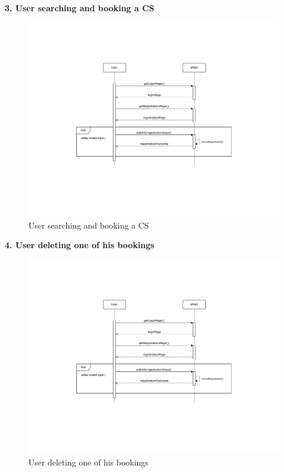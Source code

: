 \documentclass[11pt]{article}
\begin{document}
\begin{description}
    \item \textbf{3. User searching and booking a CS}
    \begin{figure}[!ht]
        \centering
        \includegraphics[page={3}, trim=1.3cm 1.5cm 1.3cm 3cm, width=\linewidth, clip]{SequenceDiagrams.pdf}
        \caption{User searching and booking a CS}
    \end{figure}
    
    \item \textbf{4. User deleting one of his bookings}
    \begin{figure}[!ht]
        \centering
        \includegraphics[page={4}, trim=7cm 8cm 6cm 3cm, width=0.8\linewidth, clip]{SequenceDiagrams.pdf}
        \caption{User deleting one of his bookings}
    \end{figure}
    

\end{description}
\end{document}
